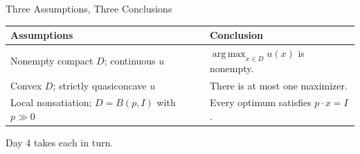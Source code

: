 \documentclass[11pt,aspectratio=169,c]{beamer}
\begin{document}
\begin{frame}{Three Assumptions, Three Conclusions}
\renewcommand{\arraystretch}{1.42}
\centering
\begin{tabular}{@{}p{}p{}@{}}
\toprule
\textbf{Assumptions} & \textbf{Conclusion}\\
\midrule
Nonempty compact $D$; continuous $u$
& $\operatorname*{arg\,max}_{x\in D}u(x)$ is nonempty.\\
Convex $D$; strictly quasiconcave $u$
& There is at most one maximizer.\\
Local nonsatiation; $D=B(p,I)$ with $p\gg0$
& Every optimum satisfies $p\cdot x=I$.\\
\bottomrule
\end{tabular}

\vspace{.9em}
Day 4 takes each in turn.
\end{frame}
\end{document}
